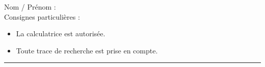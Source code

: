 
\usepackage{eurosym} %



\reversemarginpar

\pagestyle{fancy}
\fancyhead[R]{\today}

\null\vspace{-30pt}
Nom / Prénom : \\

Consignes particulières : 
\begin{itemize}[label=$\bullet$]
	\item 
	La calculatrice est {autorisée}.
	\item 
	Toute trace de recherche est prise en compte.
\end{itemize}

\hrule

